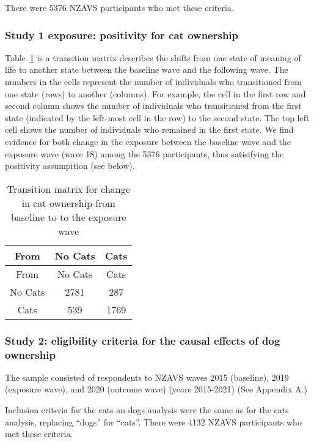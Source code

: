 \documentclass[
  singlecolumn,
  9pt]{article}
\begin{document}
There were 5376 NZAVS participants who met these criteria.

\subsubsection{Study 1 exposure: positivity for cat
ownership}\label{study-1-exposure-positivity-for-cat-ownership}

Table~\ref{tbl-transition} is a transition matrix describes the shifts
from one state of meaning of life to another state between the baseline
wave and the following wave. The numbers in the cells represent the
number of individuals who transitioned from one state (rows) to another
(columns). For example, the cell in the first row and second column
shows the number of individuals who transitioned from the first state
(indicated by the left-most cell in the row) to the second state. The
top left cell shows the number of individuals who remained in the first
state. We find evidence for both change in the exposure between the
baseline wave and the exposure wave (wave 18) among the 5376
participants, thus satisifying the positivity assumpition (see below).

\hypertarget{tbl-transition}{}
\begin{longtable}[]{@{}ccc@{}}
\caption{\label{tbl-transition}Transition matrix for change in cat
ownership from baseline to to the exposure wave}\tabularnewline
\toprule\noalign{}
From & No Cats & Cats \\
\midrule\noalign{}
\endfirsthead
\toprule\noalign{}
From & No Cats & Cats \\
\midrule\noalign{}
\endhead
\bottomrule\noalign{}
\endlastfoot
No Cats & 2781 & 287 \\
Cats & 539 & 1769 \\
\end{longtable}

\subsubsection{Study 2: eligibility criteria for the causal effects of
dog
ownership}\label{study-2-eligibility-criteria-for-the-causal-effects-of-dog-ownership}

The sample consisted of respondents to NZAVS waves 2015 (baseline), 2019
(exposure wave), and 2020 (outcome wave) (years 2015-2021) (See Appendix
A.)

Inclusion criteria for the cats an dogs analysis were the same as for
the cats analysis, replacing ``dogs'' for ``cats''. There were 4132
NZAVS participants who met these criteria.
\end{document}
